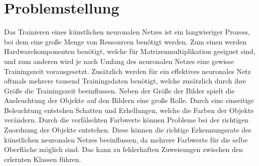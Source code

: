 \documentclass[a4paper,12pt,oneside]{article}
\begin{document}
  \newpage
  \pagestyle{plain}
  \setcounter{page}{1}
  
  \tableofcontents
  
  \newpage
  
  \section{Problemstellung}
  Das Trainieren eines künstlichen neuronalen Netzes ist ein langwieriger Prozess, bei dem 
  eine große Menge von Ressourcen benötigt werden. Zum einen werden Hardwarekomponenten benötigt, 
  welche für Matrizenmultiplikation geeignet sind, und zum anderen wird je nach Umfang des 
  neuronalen Netzes eine gewisse Trainingszeit vorausgesetzt. Zusätzlich werden für ein 
  effektives neuronales Netz oftmals mehrere tausend Trainingsdaten benötigt, welche zusätzlich 
  durch ihre Größe die Trainingszeit beeinflussen. Neben der Größe der Bilder spielt die  
  Ausleuchtung der Objekte auf den Bildern eine große Rolle. Durch eine einseitige Beleuchtung 
  entstehen Schatten und Erhellungen, welche die Farben der Objekte verändern. Durch 
  die verfälschten Farbwerte können Probleme bei der richtigen Zuordnung der Objekte entstehen. 
  Diese können die richtige Erkennungsrate
des künstlichen neuronalen Netzes beeinflussen, da mehrere Farbwerte für die selbe Oberfläche möglich sind. Das kann zu fehlerhaften Zuweisungen zwischen den erlernten Klassen führen.
\end{document}
